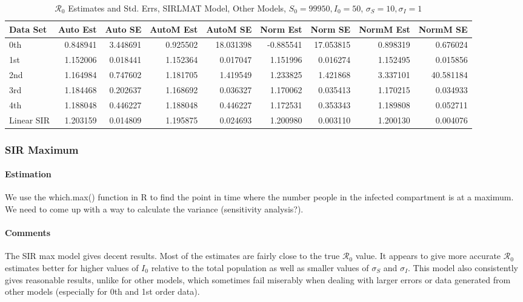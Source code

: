 \documentclass[12pt]{article}
\newcommand{\rr}{\ensuremath{\mathcal{R}_0}}
\begin{document}
\begin{table}[H]
	
	\caption{$\rr$ Estimates and Std. Errs, SIRLMAT Model,
		Other Models, $S_0 = 99950, I_0 = 50$, 
		$\sigma_S = 10, \sigma_I = 1$}
	\begin{footnotesize}
		\hskip -1cm
	\begin{tabular}{l|r|r|r|r|r|r|r|r}
		\hline
		Data Set & Auto Est & Auto SE & AutoM Est & AutoM SE & Norm Est & Norm SE & NormM Est & NormM SE\\
		\hline
		0th & 0.848941 & 3.448691 & 0.925502 & 18.031398 & -0.885541 & 17.053815 & 0.898319 & 0.676024\\
		\hline
		1st & 1.152006 & 0.018441 & 1.152364 & 0.017047 & 1.151996 & 0.016274 & 1.152495 & 0.015856\\
		\hline
		2nd & 1.164984 & 0.747602 & 1.181705 & 1.419549 & 1.233825 & 1.421868 & 3.337101 & 40.581184\\
		\hline
		3rd & 1.184468 & 0.202637 & 1.168692 & 0.036327 & 1.170062 & 0.035413 & 1.170215 & 0.034933\\
		\hline
		4th & 1.188048 & 0.446227 & 1.188048 & 0.446227 & 1.172531 & 0.353343 & 1.189808 & 0.052711\\
		\hline
		Linear SIR & 1.203159 & 0.014809 & 1.195875 & 0.024693 & 1.200980 & 0.003110 & 1.200130 & 0.004076\\
		\hline
	\end{tabular}
\end{footnotesize}
\end{table}

\subsubsection{SIR Maximum}

\paragraph{Estimation}

We use the which.max() function in R to find the point in time where the number people in the infected compartment is at a maximum. We need to come up with a way to calculate the variance (sensitivity analysis?). 

\paragraph{Comments}

The SIR max model gives decent results. Most of the estimates are fairly close to the true $\rr$ value. It appears to give more accurate $\rr$ estimates better for higher values of $I_0$ relative to the total population as well as smaller values of $\sigma_S$ and $\sigma_I$. This model also consistently gives reasonable results, unlike for other models, which sometimes fail miserably when dealing with larger errors or data generated from other models (especially for 0th and 1st order data).
\end{document}

